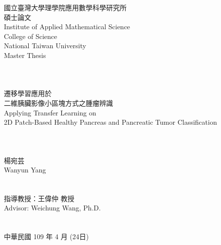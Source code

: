 \documentclass[12pt]{report}
\begin{document}
\onehalfspacing

\begin{titlepage}
\begin{center}

\begin{CJK}{UTF8}{bkai}
\Large{{國立臺灣大學理學院應用數學科學研究所\\碩士論文}}\\
\large{{Institute of Applied Mathematical Science}}\\
\large{College of Science}\\
\Large{{National Taiwan University}}\\
\Large{{Master Thesis}}\\

\hspace*{1cm}~\\
\hspace*{1cm}~\\
\hspace*{1cm}~\\

\Large{遷移學習應用於\\
二維胰臟影像小區塊方式之腫瘤辨識\\
Applying Transfer Learning on \\
2D Patch-Based Healthy Pancreas and Pancreatic Tumor Classification}\\

\hspace*{1cm}~\\
\hspace*{1cm}~\\
\hspace*{1cm}~\\

\Large{楊宛芸\\Wanyun Yang}\\
\hspace*{1cm}~\\
\hspace*{1cm}~\\

\Large{指導教授：王偉仲 教授\\Advisor: Weichung Wang, Ph.D.}\\
\hspace*{1cm}~\\
\hspace*{1cm}~\\

\Large{中華民國 109 年 4 月 (24日)}\\ 

\end{CJK}
\end{center}
\end{titlepage}
\end{document}
